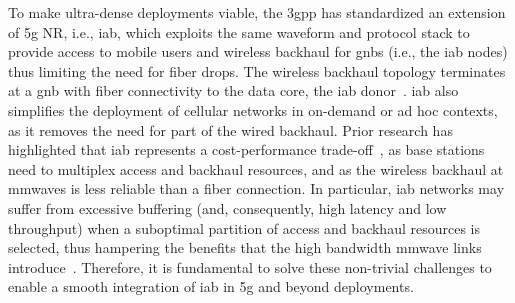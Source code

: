 To make ultra-dense deployments viable, the \gls{3gpp} has standardized an extension of \gls{5g} NR, i.e., \gls{iab}, which exploits the same waveform and protocol stack to provide access to mobile users and wireless backhaul for \glspl{gnb} (i.e., the \gls{iab} nodes) thus limiting the need for fiber drops. The wireless backhaul topology terminates at a \gls{gnb} with fiber connectivity to the data core, the \gls{iab} donor~\cite{9187867,stoch_geom2,3gpp_38_174}. \gls{iab} also simplifies the deployment of cellular networks in on-demand or ad hoc contexts, as it removes the need for part of the wired backhaul.
Prior research has highlighted that \gls{iab} represents a cost-performance trade-off~\cite{stoch_geom2, polese2020integrated}, as base stations need to multiplex access and backhaul resources, and as the wireless backhaul at \glspl{mmwave} is less reliable than a fiber connection. In particular, \gls{iab} networks may suffer from excessive buffering (and, consequently, high latency and low throughput) when a suboptimal partition of access and backhaul resources is selected, thus hampering the benefits that the high bandwidth \gls{mmwave} links introduce~\cite{polese2020integrated,polese2018end}. Therefore, it is fundamental to solve these non-trivial challenges to enable a smooth integration of \gls{iab} in \gls{5g} and beyond deployments.

